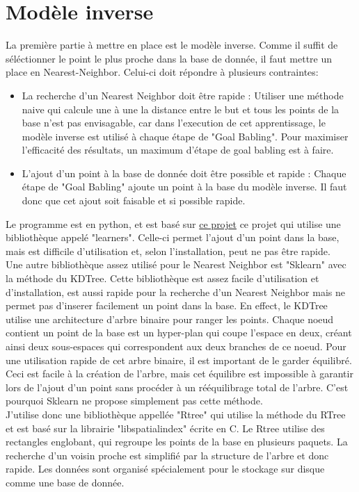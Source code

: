 \documentclass{article}
\begin{document}

\section*{Modèle inverse}

La première partie à mettre en place est le modèle inverse. Comme il suffit de séléctionner le point le plus proche dans la base de donnée, il faut mettre un place en Nearest-Neighbor. Celui-ci doit répondre à plusieurs contraintes:
\begin{itemize}
    \item La recherche d'un Nearest Neighbor doit être rapide : Utiliser une méthode naive qui calcule une à une la distance entre le but et tous les points de la base n'est pas envisagable, car dans l'execution de cet apprentissage, le modèle inverse est utilisé à chaque étape de "Goal Babling". Pour maximiser l'efficacité des résultats, un maximum d'étape de goal babling est à faire.
    \item L'ajout d'un point à la base de donnée doit être possible et rapide : Chaque étape de "Goal Babling" ajoute un point à la base du modèle inverse. Il faut donc que cet ajout soit faisable et si possible rapide.
\end{itemize}
Le programme est en python, et est basé sur \href{http://www.fabien.benureau.com/recode/benureau2015_gb/benureau2015_gb.html}{ce projet} ce projet qui utilise une bibliothèque appelé "learners". Celle-ci permet l'ajout d'un point dans la base, mais est difficile d'utilisation et, selon l'installation, peut ne pas être rapide.\\
Une autre bibliothèque assez utilisé pour le Nearest Neighbor est "Sklearn" avec la méthode du KDTree. Cette bibliothèque est assez facile d'utilisation et d'installation, est aussi rapide pour la recherche d'un Nearest Neighbor mais ne permet pas d'inserer facilement un point dans la base. En effect, le KDTree utilise une architecture d'arbre binaire pour ranger les points. Chaque noeud contient un point de la base est un hyper-plan qui coupe l'espace en deux, créant ainsi deux sous-espaces qui correspondent aux deux branches de ce noeud. Pour une utilisation rapide de cet arbre binaire, il est important de le garder équilibré. Ceci est facile à la création de l'arbre, mais cet équilibre est impossible à garantir lors de l'ajout d'un point sans procéder à un rééquilibrage total de l'arbre. C'est pourquoi Sklearn ne propose simplement pas cette méthode.\\
J'utilise donc une bibliothèque appellée "Rtree" qui utilise la méthode du RTree et est basé sur la librairie "libspatialindex" écrite en C. Le Rtree utilise des rectangles englobant, qui regroupe les points de la base en plusieurs paquets. La recherche d'un voisin proche est simplifié par la structure de l'arbre et donc rapide. Les données sont organisé spécialement pour le stockage sur disque comme une base de donnée.
\end{document}
